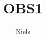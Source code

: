 \documentclass[a4paper,11pt]{article}
\title{OBS1}
\author{Niels}
\begin{document}
\maketitle

\begin{sketch}

\end{sketch}
\end{document}
